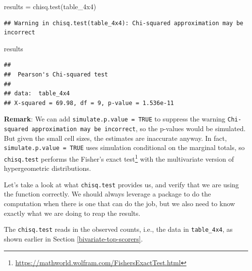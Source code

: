 \documentclass[
]{article}
\newenvironment{Shaded}{\begin{snugshade}}{\end{snugshade}}
\newcommand{\FunctionTok}[1]{\textcolor[rgb]{0.00,0.00,0.00}{#1}}
\newcommand{\NormalTok}[1]{#1}
\newcommand{\OtherTok}[1]{\textcolor[rgb]{0.56,0.35,0.01}{#1}}
\newcommand{\SpecialCharTok}[1]{\textcolor[rgb]{0.00,0.00,0.00}{#1}}
\begin{document}
\begin{Shaded}
\begin{Highlighting}[]
\NormalTok{results }\OtherTok{=} \FunctionTok{chisq.test}\NormalTok{(table\_4x4)}
\end{Highlighting}
\end{Shaded}

\begin{verbatim}
## Warning in chisq.test(table_4x4): Chi-squared approximation may be incorrect
\end{verbatim}

\begin{Shaded}
\begin{Highlighting}[]
\NormalTok{results}
\end{Highlighting}
\end{Shaded}

\begin{verbatim}
## 
##  Pearson's Chi-squared test
## 
## data:  table_4x4
## X-squared = 69.98, df = 9, p-value = 1.536e-11
\end{verbatim}

\textbf{Remark}: We can add \texttt{simulate.p.value\ =\ TRUE} to
suppress the warning
\texttt{Chi-squared\ approximation\ may\ be\ incorrect}, so the p-values
would be simulated. But given the small cell sizes, the estimates are
inaccurate anyway. In fact, \texttt{simulate.p.value\ =\ TRUE} uses
simulation conditional on the marginal totals, so \texttt{chisq.test}
performs the Fisher's exact test\footnote{\url{https://mathworld.wolfram.com/FishersExactTest.html}}
with the multivariate version of hypergeometric distributions.

Let's take a look at what \texttt{chisq.test} provides us, and verify
that we are using the function correctly. We should always leverage a
package to do the computation when there is one that can do the job, but
we also need to know exactly what we are doing to reap the results.

The \texttt{chisq.test} reads in the observed counts, i.e., the data in
\texttt{table\_4x4}, as shown earlier in Section
\ref{bivariate-top-scorers}.

\begin{Shaded}
\end{Shaded}
\end{document}
